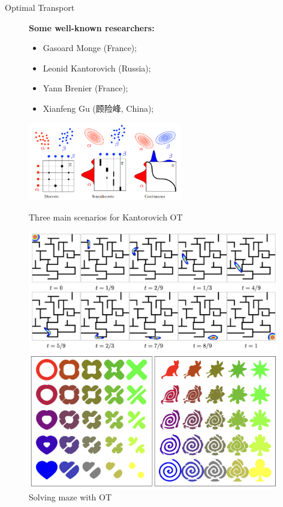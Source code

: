 \begin{frame}{Optimal Transport}
\begin{figure}
\begin{minipage}[t]{0.6\linewidth}
            \textbf{Some well-known researchers:}
            \begin{itemize}
                \item Gasoard Monge (France);
                \item Leonid Kantorovich (Russia);
                \item Yann Brenier (France);
                \item Xianfeng Gu (顾险峰, China);
            \end{itemize}
            \centering
            \includegraphics[width=0.6\textwidth]{png/3TypesOfOT.png}
            \vspace{-.7em}
            \caption{Three main scenarios for Kantorovich OT}
        \end{minipage}
        \begin{minipage}[t]{0.38\linewidth}
            \vspace{0pt}
            \centering
            \includegraphics[width=0.98\textwidth]{png/maze.png}
            \caption{Solving maze with OT}
            \includegraphics[width=0.98\textwidth]{png/2DShapeInterpolation.png}

\end{minipage}
\end{figure}
\end{frame}
